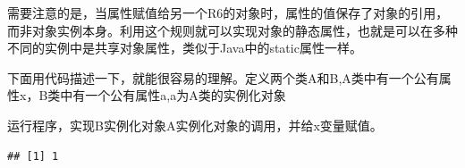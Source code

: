 \documentclass[]{book}
\newenvironment{Shaded}{\begin{snugshade}}{\end{snugshade}}
\newcommand{\KeywordTok}[1]{\textcolor[rgb]{0.13,0.29,0.53}{\textbf{#1}}}
\newcommand{\DataTypeTok}[1]{\textcolor[rgb]{0.13,0.29,0.53}{#1}}
\newcommand{\DecValTok}[1]{\textcolor[rgb]{0.00,0.00,0.81}{#1}}
\newcommand{\StringTok}[1]{\textcolor[rgb]{0.31,0.60,0.02}{#1}}
\newcommand{\CommentTok}[1]{\textcolor[rgb]{0.56,0.35,0.01}{\textit{#1}}}
\newcommand{\OtherTok}[1]{\textcolor[rgb]{0.56,0.35,0.01}{#1}}
\newcommand{\OperatorTok}[1]{\textcolor[rgb]{0.81,0.36,0.00}{\textbf{#1}}}
\newcommand{\NormalTok}[1]{#1}
\begin{document}
需要注意的是，当属性赋值给另一个R6的对象时，属性的值保存了对象的引用，而非对象实例本身。利用这个规则就可以实现对象的静态属性，也就是可以在多种不同的实例中是共享对象属性，类似于Java中的static属性一样。

下面用代码描述一下，就能很容易的理解。定义两个类A和B,A类中有一个公有属性x，B类中有一个公有属性a,a为A类的实例化对象

\begin{Shaded}
\end{Shaded}

运行程序，实现B实例化对象A实例化对象的调用，并给x变量赋值。

\begin{Shaded}
\end{Shaded}

\begin{verbatim}
## [1] 1
\end{verbatim}

\begin{Shaded}
\end{Shaded}
\end{document}
